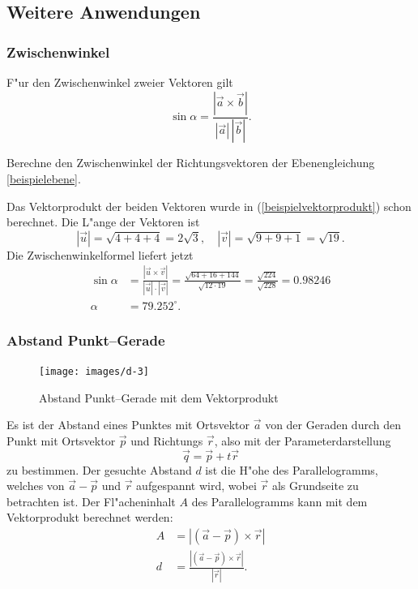 \subsection{Weitere Anwendungen}

\subsubsection{Zwischenwinkel}
F"ur den Zwischenwinkel zweier Vektoren gilt
\[
\sin\alpha=\frac{|\vec a\times\vec b|}{|\vec a|\,|\vec b|}.
\]
\begin{beispiel}
Berechne den Zwischenwinkel der Richtungsvektoren der Ebenengleichung
\ref{beispielebene}.

\smallskip

{\parindent 0pt Das Vektorprodukt der beiden Vektoren wurde
in (\ref{beispielvektorprodukt}) schon
berechnet.} Die L"ange der Vektoren ist
\[
|\vec u|=\sqrt{4+4+4}=2\sqrt{3}
,
\quad
|\vec v|=\sqrt{9+9+1}=\sqrt{19}.
\]
Die Zwischenwinkelformel liefert jetzt
\begin{align*}
\sin\alpha&=\frac{|\vec u\times \vec v|}{|\vec u|\cdot |\vec v|}
=\frac{\sqrt{64+16+144}}{\sqrt{12\cdot 19}}
=\frac{\sqrt{224}}{\sqrt{228}}=0.98246\\
\alpha&=79.252^\circ.
\end{align*}
\end{beispiel}

\subsubsection{Abstand Punkt--Gerade}
\begin{figure}
\begin{center}
\texttt{[image: images/d-3]}
\end{center}
\caption{Abstand Punkt--Gerade mit dem Vektorprodukt\label{punkt-gerade}}
\end{figure}
Es ist der Abstand eines Punktes mit Ortsvektor $\vec a$ von der
Geraden durch den Punkt mit Ortsvektor $\vec p$ und Richtungs $\vec r$,
also mit der Parameterdarstellung
\[
\vec q=\vec p+t\vec r
\]
zu bestimmen.
Der gesuchte Abstand $d$ ist die H"ohe des Parallelogramms,
welches von $\vec a-\vec p$
und $\vec r$ aufgespannt wird, wobei $\vec r$ als Grundseite zu betrachten ist. Der
Fl"acheninhalt $A$ des Parallelogramms kann mit dem Vektorprodukt berechnet werden:
\begin{align*}
A&=|(\vec a-\vec p)\times\vec r|\\
d&=\frac{|(\vec a-\vec p)\times\vec r|}{|\vec r|}.
\end{align*}
